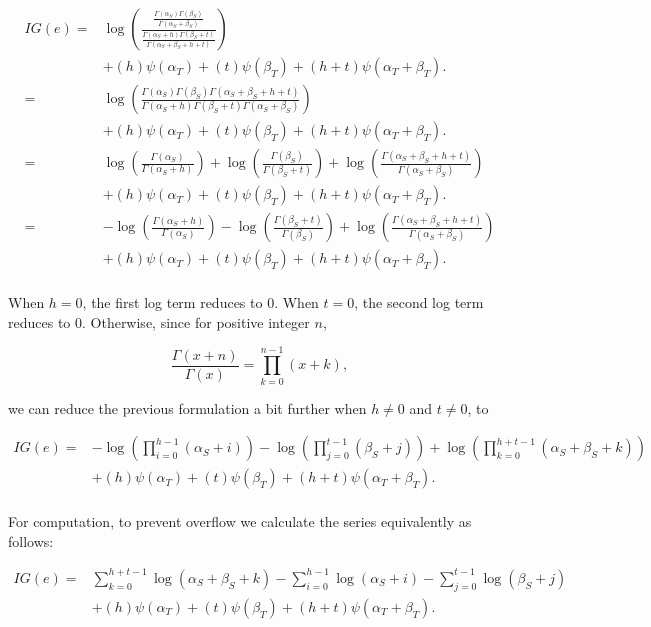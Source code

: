 \documentclass[12pt]{article}
\begin{document}
\begin{equation}
\begin{split}
IG(e) = & \log( \frac{\frac{\Gamma(\alpha_S)\Gamma(\beta_S)}{\Gamma(\alpha_S+\beta_S)}}{\frac{\Gamma(\alpha_S + h)\Gamma(\beta_S + t)}{\Gamma(\alpha_S+\beta_S + h + t)}})   \\
& + (h) \psi (\alpha_T) + (t) \psi (\beta_T) + (h + t) \psi (\alpha_T + \beta_T). \\
=& \log( \frac{\Gamma(\alpha_S)\Gamma(\beta_S) \Gamma(\alpha_S+\beta_S + h + t)}{ \Gamma(\alpha_S + h)\Gamma(\beta_S + t) \Gamma(\alpha_S+\beta_S)})   \\
& + (h) \psi (\alpha_T) + (t) \psi (\beta_T) + (h + t) \psi (\alpha_T + \beta_T). \\
=& \log( \frac{\Gamma(\alpha_S)}{\Gamma(\alpha_S + h)}) + \log( \frac{\Gamma(\beta_S)}{\Gamma(\beta_S + t)}) + \log(\frac{\Gamma(\alpha_S+\beta_S + h + t)}{  \Gamma(\alpha_S+\beta_S)})   \\
& + (h) \psi (\alpha_T) + (t) \psi (\beta_T) + (h + t) \psi (\alpha_T + \beta_T). \\
=& -\log( \frac{\Gamma(\alpha_S + h)}{\Gamma(\alpha_S)}) - \log( \frac{\Gamma(\beta_S + t)}{\Gamma(\beta_S)}) + \log(\frac{\Gamma(\alpha_S+\beta_S + h + t)}{  \Gamma(\alpha_S+\beta_S)})   \\
& + (h) \psi (\alpha_T) + (t) \psi (\beta_T) + (h + t) \psi (\alpha_T + \beta_T). \\
\end{split}
\end{equation}

\noindent When $h=0$, the first log term reduces to 0. When $t=0$, the second log term reduces to 0. Otherwise, since for positive integer $n$, 

\begin{equation}
\frac{\Gamma(x + n)}{\Gamma(x)} = \prod^{n-1}_{k=0}{(x+k)},
\end{equation}

\noindent we can reduce the previous formulation a bit further when $h \neq 0$ and $t \neq 0$, to

\begin{equation}
\begin{split}
IG(e) = &- \log(\prod^{h-1}_{i=0}(\alpha_S + i)) - \log(\prod^{t-1}_{j=0}(\beta_S + j)) + \log(\prod^{h + t -1}_{k=0}(\alpha_S + \beta_S + k)) \\
& + (h) \psi (\alpha_T) + (t) \psi (\beta_T) + (h + t) \psi (\alpha_T + \beta_T). \\
\end{split}
\end{equation}

\noindent For computation, to prevent overflow we calculate the series equivalently as follows:

\begin{equation}
\begin{split}
IG(e) = &\sum^{h + t -1}_{k=0}\log(\alpha_S + \beta_S + k) - \sum^{h-1}_{i=0}\log(\alpha_S + i) - \sum^{t-1}_{j=0}\log(\beta_S + j) \\
& + (h) \psi (\alpha_T) + (t) \psi (\beta_T) + (h + t) \psi (\alpha_T + \beta_T). \\
\end{split}
\end{equation}
\end{document}

